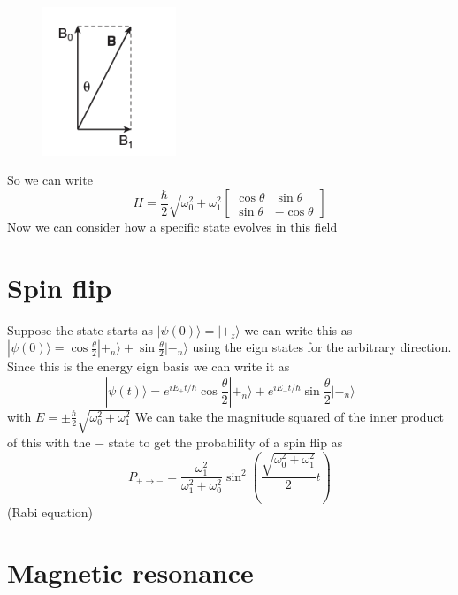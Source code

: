 \documentclass{homework}
\newcommand{\m}[1]{\begin{bmatrix} #1 \end{bmatrix}}
\newcommand{\ket}[1]{| #1 \rangle}
\begin{document}
\begin{figure}[htp]
    \centering
    \includegraphics[width=4cm]{direction.png}
\end{figure}

So we can write
\[H = \frac{\hbar}{2}\sqrt{\omega_0^2 + \omega_1^2}\m{\cos \theta & \sin \theta \\ \sin \theta & -\cos \theta}\]
Now we can consider how a specific state evolves in this field

\section{Spin flip}

Suppose the state starts as $\ket{\psi(0)} = \ket{+_z}$ we can write this as $\ket{\psi(0)} = \cos \frac{\theta}{2} \ket{+_n} + \sin \frac{\theta}{2} \ket{-_n}$ using the eign states for the arbitrary direction. Since this is the energy eign basis we can write it as
\[\ket{\psi(t)} = e^{iE_+t/\hbar}\cos \frac{\theta}{2} \ket{+_n} + e^{iE_-t/\hbar}\sin \frac{\theta}{2} \ket{-_n}\]
with $E = \pm \frac{\hbar}{2}\sqrt{\omega_0^2 + \omega_1^2}$ We can take the magnitude squared of the inner product of this with the $-$ state to get the probability of a spin flip as 
\[P_{+ \rightarrow -} = \frac{\omega_1^2}{\omega_1^2 + \omega_0^2}\sin^2 \left(\frac{\sqrt{\omega_0^2 +\omega_1^2}}{2}t \right)\]
(Rabi equation)


\section{Magnetic resonance}
\end{document}
